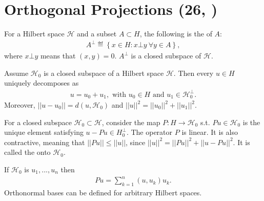 \section{Orthogonal Projections \tiny{(26, \cite{schilling2017measures})}}
For a Hilbert space \(\mathcal{H}\) and a subset \(A\subset H\), the following is the  of \(A\):
\begin{align*}
    A^{\bot} \eqdef \left\{x\in H: x\bot y\ \forall y \in A\right\},
\end{align*}
where \(x\bot y\) means that \((x,y) = 0\). \(A^{\bot}\) is a closed subspace of \(\mathcal{H}\).
\begin{proposition}
    Assume \(\mathcal{H}_0\) is a closed subspace of a Hilbert space \(\mathcal{H}\). Then every \(u\in H\) uniquely decomposes as
    \begin{align*}
        u = u_0 + u_1, \text{ with } u_0\in H \text{ and } u_1 \in \mathcal{H}_{0}^{\bot}.
    \end{align*}
    Moreover, \(||u - u_0||= d(u,\mathcal{H}_0)\) and \(||u||^2 = ||u_0||^2 + ||u_1||^2\).
\end{proposition}

For a closed subspace \(\mathcal{H}_0\subset \mathcal{H}\), consider the map \(P:H\rightarrow \mathcal{H}_0\) s.t.
\(Pu\in \mathcal{H}_0\) is the unique element satisfying \(u-Pu \in H_{0}^{\bot}\). The operator \(P\) is linear. It is also contractive, meaning that
\(||Pu||\leq ||u||\), since \(||u||^2 = ||Pu||^2 + ||u-Pu||^2\). It is called the onto \(\mathcal{H}_0\).

If \(\mathcal{H}_0\) is  \(u_1, ..., u_n\) then 
\begin{align*}
    Pu = \sum\limits^{n}_{k=1} (u,u_k)u_k.
\end{align*}
Orthonormal bases can be defined for arbitrary Hilbert spaces. 

